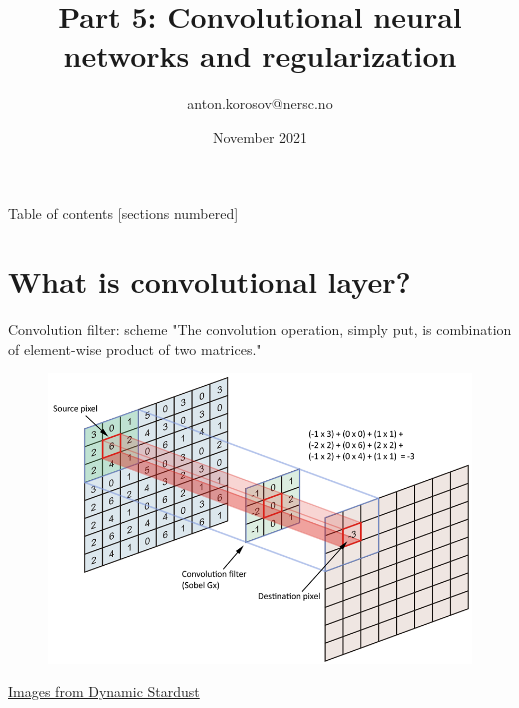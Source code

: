 \documentclass[handout]{beamer}
\title[Machine Learning]{Part 5: Convolutional neural networks and regularization}
\author[A. Korosov]{anton.korosov@nersc.no}
\institute[NERSC]{NERSC\\
slides+notebook:\url{https://github.com/nansencenter/nersc_ml_course}}
\date{November 2021}
\begin{document}
\begin{frame}
\titlepage
\end{frame}

\begin{frame}{Table of contents}
  [sections numbered]
  \tableofcontents[hideallsubsections]
\end{frame}

\section{What is convolutional layer?}

\begin{frame}{Convolution filter: scheme}
    "The convolution operation, simply put, is combination of element-wise product of two matrices."
    \begin{figure}
   \centering
    \includegraphics[width=.8\textwidth]{fig/L2/YDusp.png}
\end{figure}
{\tiny \href{https://datascience.stackexchange.com/a/23186}{ Images from Dynamic Stardust}}
\end{frame}
\end{document}
